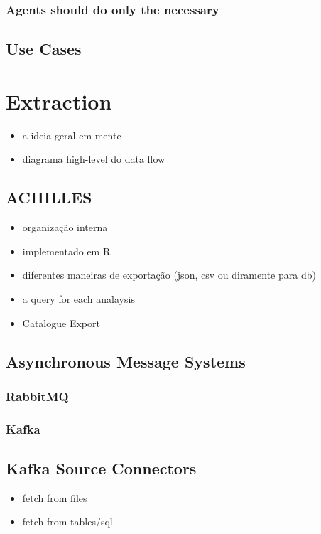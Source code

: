 \subsubsection*{Agents should do only the necessary}

\subsection{Use Cases}

\section{Extraction}

\begin{itemize}
    \item a ideia geral em mente
    \item diagrama high-level do data flow
\end{itemize}

\subsection{ACHILLES}
\begin{itemize}
    \item organização interna
    \item implementado em R
    \item diferentes maneiras de exportação (json, csv ou diramente para db)
    \item a query for each analaysis
    \item Catalogue Export
\end{itemize}

\subsection{Asynchronous Message Systems}

\subsubsection{RabbitMQ}

\subsubsection{Kafka}


\subsection{Kafka Source Connectors}
\begin{itemize}
    \item fetch from files
    \item fetch from tables/sql
\end{itemize}

